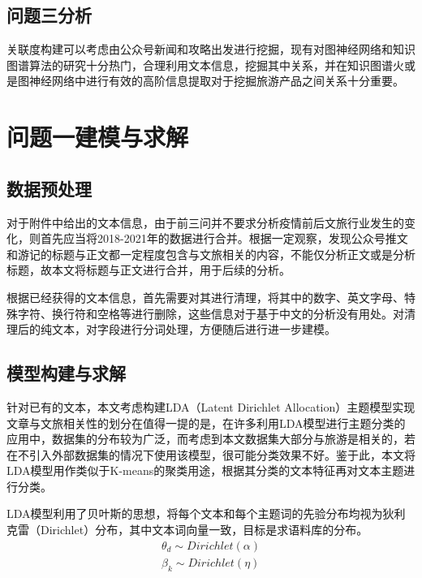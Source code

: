 \documentclass[bwprint]{gmcmthesis}
\begin{document}

\subsection{问题三分析}
关联度构建可以考虑由公众号新闻和攻略出发进行挖掘，现有对图神经网络和知识图谱算法的研究十分热门，合理利用文本信息，挖掘其中关系，并在知识图谱火或是图神经网络中进行有效的高阶信息提取对于挖掘旅游产品之间关系十分重要。

\section{问题一建模与求解}

\subsection{数据预处理}

对于附件中给出的文本信息，由于前三问并不要求分析疫情前后文旅行业发生的变化，则首先应当将2018-2021年的数据进行合并。根据一定观察，发现公众号推文和游记的标题与正文都一定程度包含与文旅相关的内容，不能仅分析正文或是分析标题，故本文将标题与正文进行合并，用于后续的分析。

根据已经获得的文本信息，首先需要对其进行清理，将其中的数字、英文字母、特殊字符、换行符和空格等进行删除，这些信息对于基于中文的分析没有用处。对清理后的纯文本，对字段进行分词处理，方便随后进行进一步建模。

\subsection{模型构建与求解}

针对已有的文本，本文考虑构建LDA（Latent Dirichlet Allocation）\cite{blei_latent_nodate}主题模型实现文章与文旅相关性的划分在值得一提的是，在许多利用LDA模型进行主题分类的应用中，数据集的分布较为广泛，而考虑到本文数据集大部分与旅游是相关的，若在不引入外部数据集的情况下使用该模型，很可能分类效果不好。鉴于此，本文将LDA模型用作类似于K-means的聚类用途，根据其分类的文本特征再对文本主题进行分类。

LDA模型利用了贝叶斯的思想，将每个文本和每个主题词的先验分布均视为狄利克雷（Dirichlet）分布，其中文本词向量一致，目标是求语料库的分布。
\begin{gather}
	\theta_d \sim Dirichlet(\alpha) \\
	\beta_k \sim Dirichlet(\eta)
\end{gather}
\end{document}
